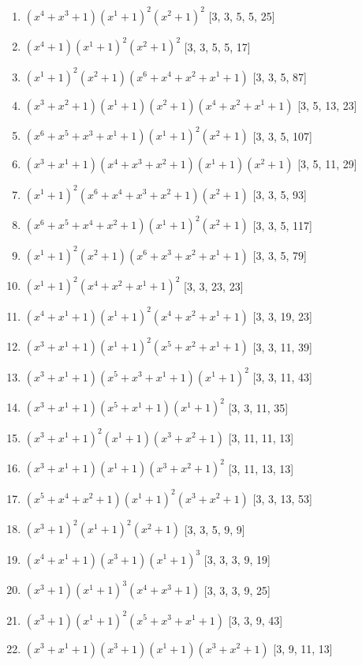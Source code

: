 \documentclass[10pt,twocolumn]{article}
\begin{document}
\begin{enumerate}
\item $(x^{4} + x^{3} + 1)(x^{1} + 1)^{2}(x^{2} + 1)^{2}$  [3, 3, 5, 5, 25]
\item $(x^{4} + 1)(x^{1} + 1)^{2}(x^{2} + 1)^{2}$  [3, 3, 5, 5, 17]
\item $(x^{1} + 1)^{2}(x^{2} + 1)(x^{6} + x^{4} + x^{2} + x^{1} + 1)$  [3, 3, 5, 87]
\item $(x^{3} + x^{2} + 1)(x^{1} + 1)(x^{2} + 1)(x^{4} + x^{2} + x^{1} + 1)$  [3, 5, 13, 23]
\item $(x^{6} + x^{5} + x^{3} + x^{1} + 1)(x^{1} + 1)^{2}(x^{2} + 1)$  [3, 3, 5, 107]
\item $(x^{3} + x^{1} + 1)(x^{4} + x^{3} + x^{2} + 1)(x^{1} + 1)(x^{2} + 1)$  [3, 5, 11, 29]
\item $(x^{1} + 1)^{2}(x^{6} + x^{4} + x^{3} + x^{2} + 1)(x^{2} + 1)$  [3, 3, 5, 93]
\item $(x^{6} + x^{5} + x^{4} + x^{2} + 1)(x^{1} + 1)^{2}(x^{2} + 1)$  [3, 3, 5, 117]
\item $(x^{1} + 1)^{2}(x^{2} + 1)(x^{6} + x^{3} + x^{2} + x^{1} + 1)$  [3, 3, 5, 79]
\item $(x^{1} + 1)^{2}(x^{4} + x^{2} + x^{1} + 1)^{2}$  [3, 3, 23, 23]
\item $(x^{4} + x^{1} + 1)(x^{1} + 1)^{2}(x^{4} + x^{2} + x^{1} + 1)$  [3, 3, 19, 23]
\item $(x^{3} + x^{1} + 1)(x^{1} + 1)^{2}(x^{5} + x^{2} + x^{1} + 1)$  [3, 3, 11, 39]
\item $(x^{3} + x^{1} + 1)(x^{5} + x^{3} + x^{1} + 1)(x^{1} + 1)^{2}$  [3, 3, 11, 43]
\item $(x^{3} + x^{1} + 1)(x^{5} + x^{1} + 1)(x^{1} + 1)^{2}$  [3, 3, 11, 35]
\item $(x^{3} + x^{1} + 1)^{2}(x^{1} + 1)(x^{3} + x^{2} + 1)$  [3, 11, 11, 13]
\item $(x^{3} + x^{1} + 1)(x^{1} + 1)(x^{3} + x^{2} + 1)^{2}$  [3, 11, 13, 13]
\item $(x^{5} + x^{4} + x^{2} + 1)(x^{1} + 1)^{2}(x^{3} + x^{2} + 1)$  [3, 3, 13, 53]
\item $(x^{3} + 1)^{2}(x^{1} + 1)^{2}(x^{2} + 1)$  [3, 3, 5, 9, 9]
\item $(x^{4} + x^{1} + 1)(x^{3} + 1)(x^{1} + 1)^{3}$  [3, 3, 3, 9, 19]
\item $(x^{3} + 1)(x^{1} + 1)^{3}(x^{4} + x^{3} + 1)$  [3, 3, 3, 9, 25]
\item $(x^{3} + 1)(x^{1} + 1)^{2}(x^{5} + x^{3} + x^{1} + 1)$  [3, 3, 9, 43]
\item $(x^{3} + x^{1} + 1)(x^{3} + 1)(x^{1} + 1)(x^{3} + x^{2} + 1)$  [3, 9, 11, 13]

\end{enumerate}
\end{document}
